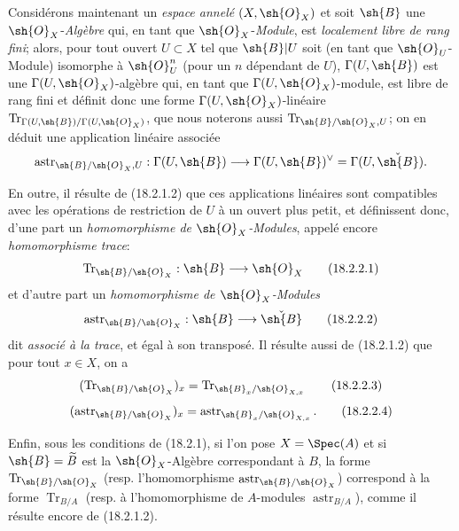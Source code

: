 \begin{env}[18.2.2]
Considérons maintenant un \emph{espace annelé} $(X,\sh{O}_X)$ et soit $\sh{B}$ une $\sh{O}_X$-\emph{Algèbre} qui, en tant que $\sh{O}_X$-\emph{Module}, est \emph{localement libre de rang fini}; alors, pour tout ouvert $U\subset X$ tel que $\sh{B}|U$ soit (en tant que $\sh{O}_U$-Module) isomorphe à $\sh{O}_U^n$ (pour un $n$ dépendant de $U$), $\Gamma(U,\sh{B})$ est une $\Gamma(U,\sh{O}_X)$-algèbre qui, en tant que $\Gamma(U,\sh{O}_X)$-module, est libre de rang fini et définit donc une forme $\Gamma(U,\sh{O}_X)$-linéaire $\operatorname{Tr}_{\Gamma(U,\sh{B})/\Gamma(U,\sh{O}_X)}$, que nous noterons aussi $\operatorname{Tr}_{\sh{B}/\sh{O}_X,U}$; on en déduit une application linéaire associée
\[
  \operatorname{astr}_{\sh{B}/\sh{O}_X,U}:\Gamma(U,\sh{B})\longrightarrow\Gamma(U,\sh{B})^\vee=\Gamma(U,\check{\sh{B}}).
\]

En outre, il résulte de (18.2.1.2) que ces applications linéaires sont compatibles avec les opérations de restriction de $U$ à un ouvert plus petit, et définissent donc, d'une part un \emph{homomorphisme de $\sh{O}_X$-Modules}, appelé encore \emph{homomorphisme trace}:
\begin{equation}
  \operatorname{Tr}_{\sh{B}/\sh{O}_X}:\sh{B}\longrightarrow\sh{O}_X
  \tag{18.2.2.1}\label{IV.18.2.2.1}
\end{equation}
et d'autre part un \emph{homomorphisme de $\sh{O}_X$-Modules}
\begin{equation}
  \operatorname{astr}_{\sh{B}/\sh{O}_X}:\sh{B}\longrightarrow\check{\sh{B}}
  \tag{18.2.2.2}\label{IV.18.2.2.2}
\end{equation}
dit \emph{associé à la trace}, et égal à son transposé. Il résulte aussi de (18.2.1.2) que pour tout $x\in X$, on a
\begin{equation}
  (\operatorname{Tr}_{\sh{B}/\sh{O}_X})_x=\operatorname{Tr}_{\sh{B}_x/\sh{O}_{X,x}}
  \tag{18.2.2.3}\label{IV.18.2.2.3}
\end{equation}
\begin{equation}
  (\operatorname{astr}_{\sh{B}/\sh{O}_X})_x=\operatorname{astr}_{\sh{B}_x/\sh{O}_{X,x}}.
  \tag{18.2.2.4}\label{IV.18.2.2.4}
\end{equation}

Enfin, sous les conditions de (18.2.1), si l'on pose $X=\Spec(A)$ et si $\sh{B}=\widetilde B$ est la $\sh{O}_X$-Algèbre correspondant à $B$, la forme $\operatorname{Tr}_{\sh{B}/\sh{O}_X}$ (resp. l'homomorphisme $\operatorname{astr}_{\sh{B}/\sh{O}_X}$) correspond à la forme $\operatorname{Tr}_{B/A}$ (resp. à l'homomorphisme de $A$-modules $\operatorname{astr}_{B/A}$), comme il résulte encore de (18.2.1.2).
\end{env}


